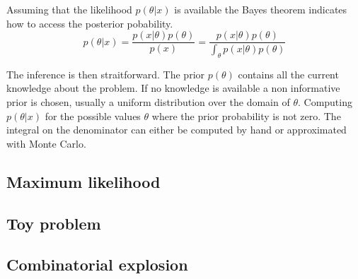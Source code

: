 Assuming that the likelihood $p(\theta | x)$ is available the Bayes theorem indicates how to access the posterior pobability.
$$
    p(\theta | x) = \frac{p(x|\theta) p(\theta)}{p(x)} = \frac{p(x|\theta) p(\theta)}{\int_\theta p(x|\theta) p(\theta)}
$$

The inference is then straitforward.
The prior $p(\theta)$ contains all the current knowledge about the problem. 
If no knowledge is available a non informative prior is chosen, usually a uniform distribution over the domain of $\theta$.
Computing $p(\theta | x)$ for the possible values $\theta$ \ie where the prior probability is not zero.
The integral on the denominator can either be computed by hand or approximated with Monte Carlo.



\subsection{Maximum likelihood} %
\label{sub:maximum_likelihood}





\subsection{Toy problem} %
\label{sub:toy_problem}





\subsection{Combinatorial explosion} %
\label{sub:combinatorial_explosion}





